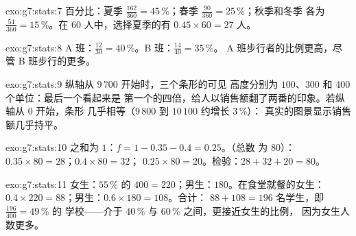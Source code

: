 \begin{solution}{exo:g7:stats:7}
百分比：夏季 $\frac{162}{360} = 45\,\%$；春季
$\frac{90}{360} = 25\,\%$；秋季和冬季
各为 $\frac{54}{360} = 15\,\%$。在 $60$ 人中，选择夏季的有
$0.45 \times 60 = 27$ 人。
\end{solution}

\begin{solution}{exo:g7:stats:8}
A 班：$\frac{12}{30} = 40\,\%$。B 班：$\frac{14}{40} = 35\,\%$。
A 班步行者的比例更高，尽管
B 班步行的更多。
\end{solution}

\begin{solution}{exo:g7:stats:9}
纵轴从 $9\,700$ 开始时，三个条形的可见
高度分别为 $100$、$300$ 和 $400$ 个单位：最后一个看起来是
第一个的四倍，给人以销售额翻了两番的印象。若纵轴从 $0$ 开始，条形
几乎相等（$9\,800$ 到 $10\,100$ 约增长 $3\,\%$）：
真实的图景显示销售额几乎持平。
\end{solution}

\begin{solution}{exo:g7:stats:10}
之和为 $1$：$f = 1 - 0.35 - 0.4 = 0.25$。（总数
为 $80$）：$0.35 \times 80 = 28$；$0.4 \times 80 = 32$；
$0.25 \times 80 = 20$。检验：$28 + 32 + 20 = 80$。
\end{solution}

\begin{solution}{exo:g7:stats:11}
女生：$55\,\%$ 的 $400 = 220$；男生：$180$。在食堂就餐的女生：
$0.4 \times 220 = 88$；男生：$0.6 \times 180 = 108$。合计：
$88 + 108 = 196$ 名学生，即 $\frac{196}{400} = 49\,\%$ 的
学校——介于 $40\,\%$ 与 $60\,\%$ 之间，更接近女生的比例，
因为女生人数更多。
\end{solution}

